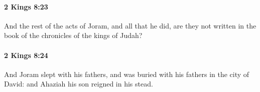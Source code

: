 		\paragraph{2 Kings 8:23} %
			\label{2KINGS-8-23}

			And the rest of the acts of Joram, and all that he did, are they not written in the book of the chronicles of the kings of Judah?


		\paragraph{2 Kings 8:24} %
			\label{2KINGS-8-24}

			And Joram slept with his fathers, and was buried with his fathers in the city of David: and Ahaziah his son reigned in his stead.



